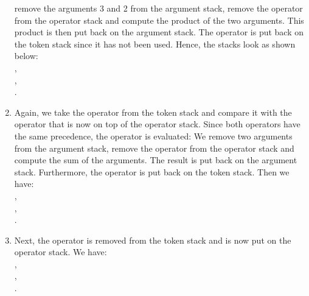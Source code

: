 \begin{enumerate}
      remove the arguments 3 and 2 from the argument stack, remove the operator
       from the operator stack and compute the product of the two
      arguments.  This product is then put back on the 
      argument stack.  The operator  is put back on the token stack
      since it has not been used.  Hence, the stacks look as shown below: \\[0.2cm]
      \hspace*{1.3cm} , \\[0.2cm]
      \hspace*{1.3cm} , \\[0.2cm]
      \hspace*{1.3cm} . 
\item Again, we take the operator  from the token stack and
      compare it with the operator  that is now on top of the
      operator stack.  Since both operators have the same precedence, the operator
       is evaluated:  We remove two arguments from the argument
      stack, remove the operator
       from the operator stack  and compute the sum of the
      arguments.  The result is put back on the argument stack.  Furthermore, the operator
       is put back on the token stack.
      Then we have: \\[0.2cm]
      \hspace*{1.3cm} , \\[0.2cm]
      \hspace*{1.3cm} , \\[0.2cm]
      \hspace*{1.3cm} . 
\item Next, the operator  is removed from the token stack and is now
      put on the operator stack.  We have: \\[0.2cm]
      \hspace*{1.3cm} , \\[0.2cm]
      \hspace*{1.3cm} , \\[0.2cm]
      \hspace*{1.3cm} . 

\end{enumerate}
